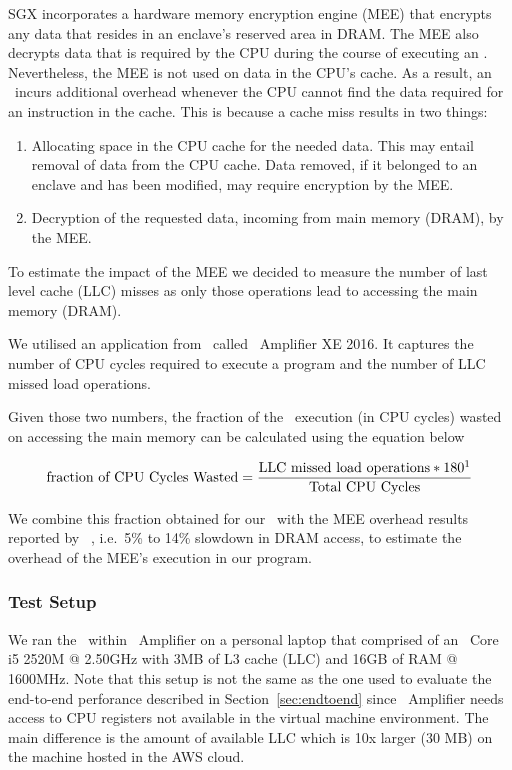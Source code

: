 \documentclass[../../../main.tex]{subfiles}
\begin{document}
\label{sec:mem-analysis}
SGX incorporates a hardware memory encryption engine (MEE) that encrypts any
data that resides in an enclave's reserved area in DRAM. The MEE also decrypts
data that is required by the CPU during the course of executing an
\enclaveprogram. Nevertheless, the MEE is not used on data in the CPU's cache.
As a result, an \enclaveprogram~incurs additional overhead whenever the CPU
cannot find the data required for an instruction in the cache. This is because
a cache miss results in two things:
\begin{enumerate}
  \item Allocating space in the CPU cache for the needed data. This may entail
    removal of data from the CPU cache. Data removed, if it belonged to an
    enclave and has been modified, may require encryption by the MEE.
  \item Decryption of the requested data, incoming from main memory (DRAM), by
    the MEE.
\end{enumerate}

To estimate the impact of the MEE we decided to measure the number of last
level cache (LLC) misses as only those operations lead to accessing the main
memory (DRAM).

We utilised an application from \Intel~called \VTune~Amplifier XE 2016. It
captures the number of CPU cycles required to execute a program and the number
of LLC missed load operations. 

Given those two numbers, the fraction of the \enclaveprogram~execution (in CPU
cycles) wasted on accessing the main memory can be calculated using the
equation below~\cite{intel-eqn}

\begin{align*}
 \text{fraction of CPU Cycles Wasted} = 
    \frac{\text{LLC missed load operations} * 180\footnotemark}
      {\text{Total CPU Cycles}}
\end{align*}


We combine this fraction obtained for our \busywait~with the MEE overhead
results reported by \Intel~\cite{REFERENCE}, i.e.\ 5\% to 14\% slowdown in
DRAM access, to estimate the overhead of the MEE's execution in our program. 

\subsubsection*{Test Setup}
We ran the \enclavemodel~within \VTune~Amplifier on a personal laptop that
comprised of an \Intel~Core i5 2520M @ 2.50GHz with 3MB of L3 cache (LLC) and
16GB of RAM @ 1600MHz. Note that this setup is not the same as the one used to
evaluate the end-to-end perforance described in Section~\ref{sec:endtoend}
since \VTune~Amplifier needs access to CPU registers not available in the
virtual machine environment. The main difference is the amount of available
LLC which is 10x larger (30 MB) on the machine hosted in the AWS cloud.
\end{document}
